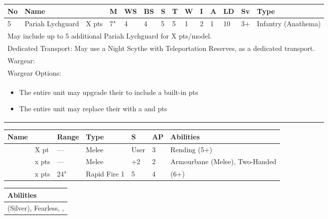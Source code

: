 

\noindent
\begin{tabular}{||m{10pt} m{95pt} m{30pt} m{11pt} m{11pt} m{11pt} m{11pt} m{11pt} m{11pt} m{11pt} m{11pt} m{11pt} m{11pt} m{125pt}||}
	\hline
	No & Name & & M & WS & BS & S & T & W & I & A & LD & Sv & Type \\
	\hline
	5 & Pariah Lychguard & X pts & 7" & 4 & 4 & 5 & 5 & 1 & 2 & 1 & 10 & 3+ & Infantry (Anathema)\\
	\hline
	\hline
	\multicolumn{14}{||Z{532 pt}||}{May include up to 5 additional Pariah Lychguard for X pts/model.}\\	
	\multicolumn{14}{||Z{532 pt}||}{Dedicated Transport: May use a Night Scythe with Teleportation Reserves, as a dedicated transport.}\\	
	\hline
	\hline
	\multicolumn{14}{||Z{532 pt}||}{Wargear: \quickref{Warscythe}}\\
	\multicolumn{14}{||Z{532 pt}||}{Wargear Options:} \\
	\multicolumn{14}{||Z{532 pt}||}{\begin{itemize}
			\item The entire unit may upgrade their \quickref{Warscythe} to include a built-in \quickref{Gauss Blaster} \hrulefill 5 pts
			\item The entire unit may replace their \quickref{Warscythe} with a \quickref{Hyperphase Sword} and \quickref{Dispersion Shield} \hrulefill 10 pts
		\end{itemize}} \\
	\hline
\end{tabular}

\noindent
\begin{tabular}{||m{110pt} m{30pt} m{31pt} m{55pt} m{12pt} m{12pt} m{210pt}||}
	\hline
	Name & & Range & Type & S & AP & Abilities \\
	\hline
	\quickref{Hyperphase Sword} & X pt & — & Melee & User & 3 & Rending (5+) \\
	\quickref{Warscythe} & x pts& — & Melee & +2 & 2 & Armourbane (Melee), Two-Handed \\
	\quickref{Gauss Blaster} & x pts& 24" & Rapid Fire 1 & 5 & 4 & \quickref{Gauss} (6+) \\
	\hline
\end{tabular}

\noindent
\begin{tabular}{||m{532pt}||}
	\hline
	Abilities \\
	\hline
	\quickref{Awakening Protocols} (Silver), Fearless, \quickref{Living Metal}, \quickref{Reanimation Protocols} \\
	\hline
\end{tabular}


